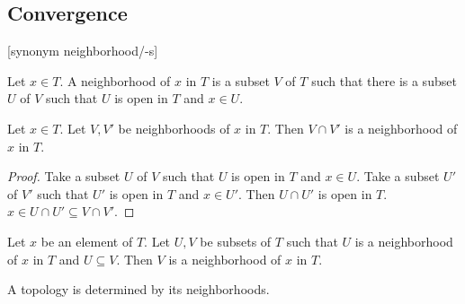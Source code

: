 \documentclass[11pt]{article}
\begin{document}
\subsection{Convergence}

\begin{forthel}

[synonym neighborhood/-s]

\begin{definition} Let $x \in T$. A neighborhood of $x$ in $T$
is a subset $V$ of $T$ such that there is a subset $U$ of $V$  
such that $U$ is open in $T$ and $x \in U$.
\end{definition}

\begin{lemma} Let $x \in T$. Let $V,V'$ be neighborhoods of $x$ in $T$.
Then $V \cap V'$ is a neighborhood of $x$ in $T$.
\end{lemma}
\begin{proof} Take a subset $U$ of $V$ such that $U$ is open
in $T$ and $x \in U$.
Take a subset $U'$ of $V'$ such that $U'$ is open
in $T$ and $x \in U'$.
Then $U \cap U'$ is open in $T$.
$x \in U \cap U' \subseteq V \cap V'$.
\end{proof}

\begin{lemma}
Let $x$ be an element of $T$. Let $U,V$ be subsets of $T$
such that $U$ is a neighborhood of
$x$ in $T$ and $U \subseteq V$.
Then $V$ is a neighborhood of $x$ in $T$.
\end{lemma}

\end{forthel}
A topology is determined by its neighborhoods.
\end{document}
